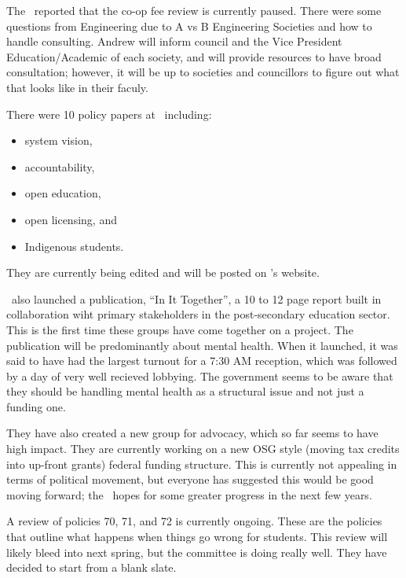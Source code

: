 \begin{information}

    The \vpe\ reported that the co-op fee review is currently paused. There
    were some questions from Engineering due to A vs B Engineering Societies and 
    how to handle consulting. Andrew will inform council and the Vice President
    Education/Academic of each society, and will provide resources to have
    broad consultation; however, it will be up to societies and councillors to
    figure out what that looks like in their faculy. 

    There were 10 policy papers at \ousa\ including: 
    \begin{itemize}
        \item system vision, 
        \item accountability,
        \item open education,
        \item open licensing, and
        \item Indigenous students.
    \end{itemize} They are currently being edited and will be posted on \ousa's
    website. 

    \ousa\ also launched a publication, ``In It Together'', a 10 to 12 page 
    report built in collaboration wiht primary stakeholders in the 
    post-secondary education sector. This is the first time these
    groups have come together on a project. The publication will be
    predominantly about mental health. When it launched, it was said to have
    had the largest turnout for a 7:30 AM reception, which was followed by  a 
    day of very well recieved lobbying. The government seems to be aware that 
    they should be handling mental health as a structural issue and not just a
    funding one.

    They have also created a new group for advocacy, which so far seems to have
    high impact. They are currently working on a new OSG style (moving tax
    credits into up-front grants) federal funding structure. This is currently
    not appealing in terms of political movement, but everyone has suggested 
    this would be good moving forward; the \vped\ hopes for some greater 
    progress in the next few years. 

    A review of policies 70, 71, and 72 is currently ongoing. These are the 
    policies that outline what happens when things go wrong for students.
    This review will likely bleed into next spring, but the committee is doing
    really well. They have decided to start from a blank slate. 


\end{information}
